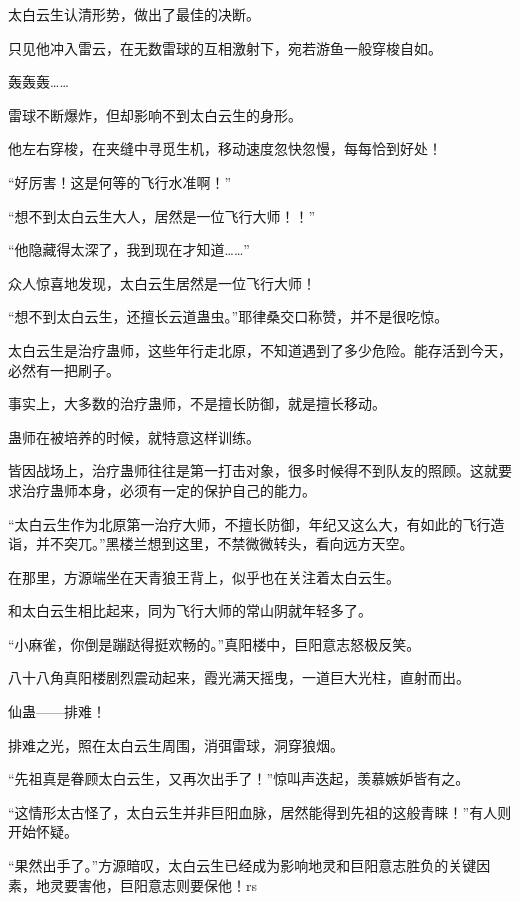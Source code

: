 \begin{this_body}
太白云生认清形势，做出了最佳的决断。

只见他冲入雷云，在无数雷球的互相激射下，宛若游鱼一般穿梭自如。

轰轰轰……

雷球不断爆炸，但却影响不到太白云生的身形。

他左右穿梭，在夹缝中寻觅生机，移动速度忽快忽慢，每每恰到好处！

“好厉害！这是何等的飞行水准啊！”

“想不到太白云生大人，居然是一位飞行大师！！”

“他隐藏得太深了，我到现在才知道……”

众人惊喜地发现，太白云生居然是一位飞行大师！

“想不到太白云生，还擅长云道蛊虫。”耶律桑交口称赞，并不是很吃惊。

太白云生是治疗蛊师，这些年行走北原，不知道遇到了多少危险。能存活到今天，必然有一把刷子。

事实上，大多数的治疗蛊师，不是擅长防御，就是擅长移动。

蛊师在被培养的时候，就特意这样训练。

皆因战场上，治疗蛊师往往是第一打击对象，很多时候得不到队友的照顾。这就要求治疗蛊师本身，必须有一定的保护自己的能力。

“太白云生作为北原第一治疗大师，不擅长防御，年纪又这么大，有如此的飞行造诣，并不突兀。”黑楼兰想到这里，不禁微微转头，看向远方天空。

在那里，方源端坐在天青狼王背上，似乎也在关注着太白云生。

和太白云生相比起来，同为飞行大师的常山阴就年轻多了。

“小麻雀，你倒是蹦跶得挺欢畅的。”真阳楼中，巨阳意志怒极反笑。

八十八角真阳楼剧烈震动起来，霞光满天摇曳，一道巨大光柱，直射而出。

仙蛊——排难！

排难之光，照在太白云生周围，消弭雷球，洞穿狼烟。

“先祖真是眷顾太白云生，又再次出手了！”惊叫声迭起，羡慕嫉妒皆有之。

“这情形太古怪了，太白云生并非巨阳血脉，居然能得到先祖的这般青睐！”有人则开始怀疑。

“果然出手了。”方源暗叹，太白云生已经成为影响地灵和巨阳意志胜负的关键因素，地灵要害他，巨阳意志则要保他！rs

\end{this_body}


